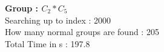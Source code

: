 \textbf{Group : $C_2*C_5$}\\
Searching up to index : 2000\\
How many normal groups are found : 205\\
Total Time in s : 197.8\\
